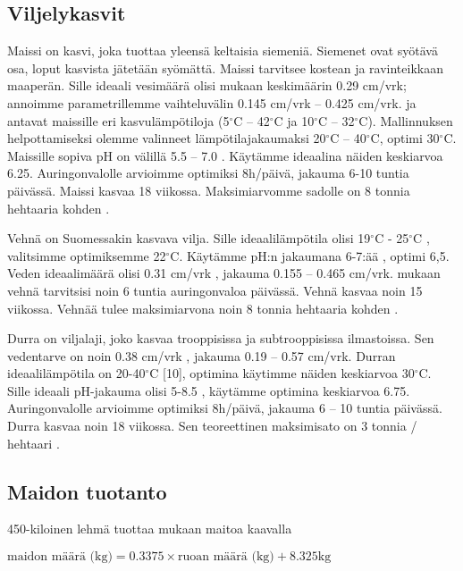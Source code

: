\documentclass[12pt]{scrreprt}
\begin{document}
  \subsection{Viljelykasvit}

  Maissi on kasvi, joka tuottaa yleensä keltaisia siemeniä. Siemenet ovat
  syötävä osa, loput kasvista jätetään syömättä. Maissi tarvitsee kostean ja
  ravinteikkaan maaperän. Sille ideaali vesimäärä olisi \cite{cropwater} mukaan
  keskimäärin 0.29 cm/vrk; annoimme parametrillemme vaihteluvälin 0.145 cm/vrk
  – 0.425 cm/vrk. \cite{ugandamaize} ja \cite{plessismaize} antavat maissille
  eri kasvulämpötiloja (5$^{\circ}$C – 42$^{\circ}$C ja 10$^{\circ}$C –
  32$^{\circ}$C). Mallinnuksen helpottamiseksi olemme valinneet
  lämpötilajakaumaksi 20$^{\circ}$C – 40$^{\circ}$C, optimi 30$^{\circ}$C.
  Maissille sopiva pH on välillä 5.5 – 7.0 \cite{corngrowing}. Käytämme
  ideaalina näiden keskiarvoa 6.25. Auringonvalolle arvioimme optimiksi
  8h/päivä, jakauma 6-10 tuntia päivässä. Maissi kasvaa 18 viikossa.
  Maksimiarvomme sadolle on 8 tonnia hehtaaria kohden \cite{iita}.

  Vehnä on Suomessakin kasvava vilja. Sille ideaalilämpötila olisi 19$^{\circ}$C
  - 25$^{\circ}$C \cite{wheat}, valitsimme optimiksemme 22$^{\circ}$C. Käytämme
  pH:n jakaumana 6-7:ää \cite{wheatfert}, optimi 6,5. Veden ideaalimäärä olisi
  0.31 cm/vrk \cite{cropwater}, jakauma  0.155 – 0.465 cm/vrk. \cite{growwheat}
  mukaan vehnä tarvitsisi noin 6 tuntia auringonvaloa päivässä. Vehnä kasvaa
  noin 15 viikossa. Vehnää tulee maksimiarvona noin 8 tonnia hehtaaria kohden
  \cite{sri}.

  Durra on viljalaji, joko kasvaa trooppisissa ja subtrooppisissa ilmastoissa.
  Sen vedentarve on noin 0.38 cm/vrk \cite{cropwater}, jakauma 0.19 –
  0.57 cm/vrk. Durran ideaalilämpötila on 20-40$^{\circ}$C [10], optimina
  käytimme näiden keskiarvoa 30$^{\circ}$C. Sille ideaali pH-jakauma olisi 5-8.5
  \cite{moench}, käytämme optimina keskiarvoa 6.75. Auringonvalolle arvioimme
  optimiksi 8h/päivä, jakauma 6 – 10 tuntia päivässä. Durra kasvaa noin 18
  viikossa. Sen teoreettinen maksimisato on 3 tonnia / hehtaari \cite{wylie}.

  \subsection{Maidon tuotanto}
  450-kiloinen lehmä tuottaa \cite{milk} mukaan maitoa kaavalla
  
  \begin{em}
  $ \text{maidon määrä (kg)} = 0.3375 \times \text{ruoan määrä (kg)}
  + 8.325\text{kg} $ \end{em}
\end{document}
